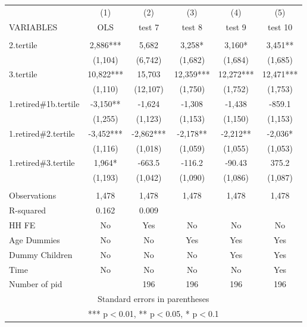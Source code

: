 \begin{tabular}{lccccc} \hline
 & (1) & (2) & (3) & (4) & (5) \\
VARIABLES & OLS & test 7 & test 8 & test 9 & test 10 \\ \hline
 &  &  &  &  &  \\
2.tertile & 2,886*** & 5,682 & 3,258* & 3,160* & 3,451** \\
 & (1,104) & (6,742) & (1,682) & (1,684) & (1,685) \\
3.tertile & 10,822*** & 15,703 & 12,359*** & 12,272*** & 12,471*** \\
 & (1,110) & (12,107) & (1,750) & (1,752) & (1,753) \\
1.retired\#1b.tertile & -3,150** & -1,624 & -1,308 & -1,438 & -859.1 \\
 & (1,255) & (1,123) & (1,153) & (1,150) & (1,153) \\
1.retired\#2.tertile & -3,452*** & -2,862*** & -2,178** & -2,212** & -2,036* \\
 & (1,116) & (1,018) & (1,059) & (1,055) & (1,053) \\
1.retired\#3.tertile & 1,964* & -663.5 & -116.2 & -90.43 & 375.2 \\
 & (1,193) & (1,042) & (1,090) & (1,086) & (1,087) \\
 &  &  &  &  &  \\
Observations & 1,478 & 1,478 & 1,478 & 1,478 & 1,478 \\
R-squared & 0.162 & 0.009 &  &  &  \\
HH FE & No & Yes & No & No & No \\
Age Dummies & No & No & Yes & Yes & Yes \\
Dummy Children & No & No & No & Yes & Yes \\
Time & No & No & No & No & Yes \\
 Number of pid &  & 196 & 196 & 196 & 196 \\ \hline
\multicolumn{6}{c}{ Standard errors in parentheses} \\
\multicolumn{6}{c}{ *** p$<$0.01, ** p$<$0.05, * p$<$0.1} \\
\end{tabular}
